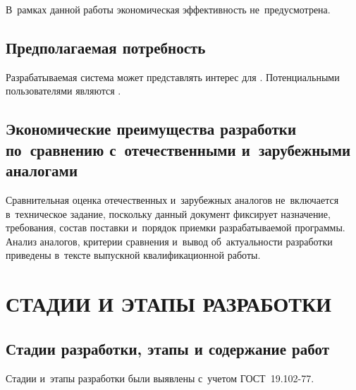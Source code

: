 \documentclass[12pt,a4paper]{extarticle}
\begin{document}
В~рамках данной работы экономическая эффективность не~предусмотрена.

\subsection{Предполагаемая потребность}

Разрабатываемая система может представлять интерес для . Потенциальными пользователями являются .

\subsection{Экономические преимущества разработки по~сравнению с~отечественными и~зарубежными аналогами}

Сравнительная оценка отечественных и~зарубежных аналогов не~включается в~техническое задание, поскольку данный документ фиксирует назначение, требования, состав поставки и~порядок приемки разрабатываемой программы. Анализ аналогов, критерии сравнения и~вывод об~актуальности разработки приведены в~тексте выпускной квалификационной работы.

\clearpage

\section{СТАДИИ И ЭТАПЫ РАЗРАБОТКИ}

\subsection{Стадии разработки, этапы и содержание работ}

Стадии и~этапы разработки были выявлены с~учетом ГОСТ~19.102-77\cite{gost19102}.
\end{document}
